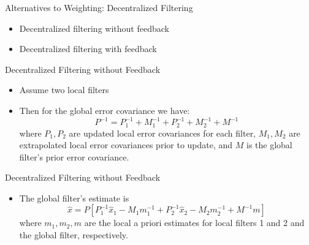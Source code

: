 \begin{frame}
Alternatives to Weighting: Decentralized Filtering
\begin{itemize}
  \item Decentralized filtering without feedback
  \item Decentralized filtering with feedback
\end{itemize} 
\end{frame}

\begin{frame}
Decentralized Filtering without Feedback
\begin{itemize}
  \item Assume two local filters
  \item Then for the global error covariance we have:
\[P^{-1}=P_1^{-1}+M_1^{-1}+P_2^{-1}+M_2^{-1}+M^{-1}\]
where $P_1,P_2$ are updated local error covariances for each filter, $M_1,M_2$ are extrapolated local error covariances prior to update, and $M$ is the global filter's prior error covariance.
\end{itemize} 
\end{frame}

\begin{frame}
Decentralized Filtering without Feedback
\begin{itemize}
  \item The global filter's estimate is
\[\hat{x}=P\left[P_1^{-1}\hat{x}_1-M_1m_1^{-1}+P_2^{-1}\hat{x}_2-M_2m_2^{-1}+M^{-1}m\right]\]
where $m_1,m_2,m$ are the local a priori estimates for local filters 1 and 2 and the global filter, respectively.
\end{itemize} 
\end{frame}
